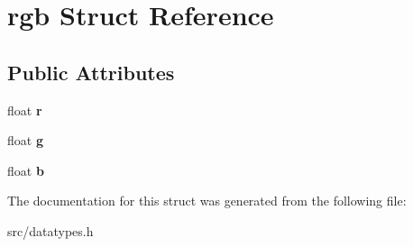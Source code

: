 \hypertarget{structrgb}{
\section{rgb Struct Reference}
\label{structrgb}
}
\subsection*{Public Attributes}
\begin{DoxyCompactItemize}
\item 
\hypertarget{structrgb_a417987de6545982be6012a0c8ba517c6}{
float {\bfseries r}}
\label{structrgb_a417987de6545982be6012a0c8ba517c6}

\item 
\hypertarget{structrgb_a8ebc8e4a87db5d5dda3980b88fe31f35}{
float {\bfseries g}}
\label{structrgb_a8ebc8e4a87db5d5dda3980b88fe31f35}

\item 
\hypertarget{structrgb_ac2be2182f82e2c3c99860a560b19ec57}{
float {\bfseries b}}
\label{structrgb_ac2be2182f82e2c3c99860a560b19ec57}

\end{DoxyCompactItemize}


The documentation for this struct was generated from the following file:\begin{DoxyCompactItemize}
\item 
src/datatypes.h\end{DoxyCompactItemize}
